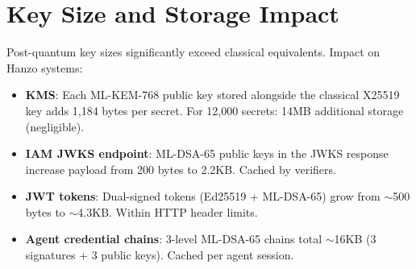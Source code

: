 \section{Key Size and Storage Impact}

\label{sec:storage}

Post-quantum key sizes significantly exceed classical equivalents. Impact on
Hanzo systems:
\begin{itemize}[leftmargin=1.1em]
    \item \textbf{KMS}: Each ML-KEM-768 public key stored alongside the
    classical X25519 key adds 1,184 bytes per secret. For 12,000 secrets:
    14MB additional storage (negligible).
    \item \textbf{IAM JWKS endpoint}: ML-DSA-65 public keys in the JWKS
    response increase payload from 200 bytes to 2.2KB. Cached by verifiers.
    \item \textbf{JWT tokens}: Dual-signed tokens (Ed25519 + ML-DSA-65) grow
    from $\sim$500 bytes to $\sim$4.3KB. Within HTTP header limits.
    \item \textbf{Agent credential chains}: 3-level ML-DSA-65 chains total
    $\sim$16KB (3 signatures + 3 public keys). Cached per agent session.
\end{itemize}

